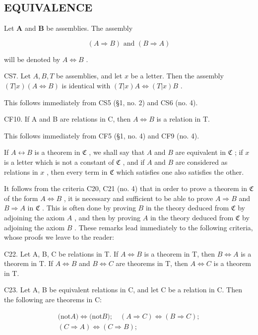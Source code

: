 \subsection{EQUIVALENCE}

Let \(\pmb{A}\) and \(\pmb{B}\) be assemblies. The assembly

\[
(A \Longrightarrow B) \text { and } (B \Longrightarrow A)
\]

will be denoted by \(A \Longleftrightarrow B\) .

CS7. Let \(A, B, T\) be assemblies, and let \(x\) be a letter. Then the assembly \((T|x)(A \Longleftrightarrow B)\) is identical with \((T|x)A \Longleftrightarrow (T|x)B\) .

This follows immediately from CS5 (§1, no. 2) and CS6 (no. 4).

CF10. If A and B are relations in C, then \(A \Longleftrightarrow B\) is a relation in T.

This follows immediately from CF5 (§1, no. 4) and CF9 (no. 4).

If \(A \leftrightarrow B\) is a theorem in \(\mathfrak{C}\) , we shall say that \(A\) and \(B\) are equivalent in \(\mathfrak{C}\) ; if \(x\) is a letter which is not a constant of \(\mathfrak{C}\) , and if \(A\) and \(B\) are considered as relations in \(x\) , then every term in \(\mathfrak{C}\) which satisfies one also satisfies the other.

It follows from the criteria C20, C21 (no. 4) that in order to prove a theorem in \(\mathfrak{C}\) of the form \(A \Longleftrightarrow B\) , it is necessary and sufficient to be able to prove \(A \Longrightarrow B\) and \(B \Longrightarrow A\) in \(\mathfrak{C}\) . This is often done by proving \(B\) in the theory deduced from \(\mathfrak{C}\) by adjoining the axiom \(A\) , and then by proving \(A\) in the theory deduced from \(\mathfrak{C}\) by adjoining the axiom \(B\) . These remarks lead immediately to the following criteria, whose proofs we leave to the reader:

C22. Let A, B, C be relations in T. If \(A \Longleftrightarrow B\) is a theorem in T, then \(B \Longleftrightarrow A\) is a theorem in T. If \(A \Longleftrightarrow B\) and \(B \Longleftrightarrow C\) are theorems in T, then \(A \Longleftrightarrow C\) is a theorem in T.

C23. Let A, B be equivalent relations in C, and let C be a relation in C. Then the following are theorems in C:

\[
\begin{array}{c} \text {(not} A) \iff \text {(not} B); \quad (A \Rightarrow C) \iff (B \Rightarrow C); \\ (C \Rightarrow A) \iff (C \Rightarrow B); \end{array}
\]

